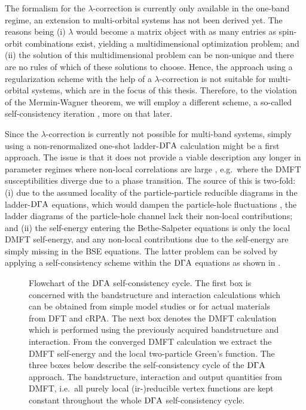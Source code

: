 \documentclass[../../main.tex]{subfiles}
\begin{document}
The formalism for the $\lambda$-correction is currently only available in the one-band regime, an extension to multi-orbital systems has not been derived yet. The reasons being (i) $\lambda$ would become a matrix object with as many entries as spin-orbit combinations exist, yielding a multidimensional optimization problem; and (ii) the solution of this multidimensional problem can be non-unique and there are no rules of which of these solutions to choose. Hence, the approach using a regularization scheme with the help of a $\lambda$-correction is not suitable for multi-orbital systems, which are in the focus of this thesis. Therefore, to  the violation of the Mermin-Wagner theorem, we will employ a different scheme, a so-called self-consistency iteration \cite{Kaufmann2021}, more on that later. 

Since the $\lambda$-correction is currently not possible for multi-band systems, simply using a non-renormalized one-shot ladder-$\text{D}\Gamma\text{A}$ calculation might be a first approach. The issue is that it does not provide a viable description any longer in parameter regimes where non-local correlations are large \cite{Kaufmann2021}, e.g.\ where the DMFT susceptibilities diverge due to a phase transition. The source of this is two-fold: (i) due to the assumed locality of the particle-particle reducible diagrams in the ladder-$\text{D}\Gamma\text{A}$ equations, which would dampen the particle-hole fluctuations \cite{Rohringer2016}, the ladder diagrams of the particle-hole channel lack their non-local contributions; and (ii) the self-energy entering the Bethe-Salpeter equations is only the local DMFT self-energy, and any non-local contributions due to the self-energy are simply missing in the BSE equations. The latter problem can be solved by applying a self-consistency scheme within the $\text{D}\Gamma\text{A}$ equations as shown in  \cite{Kaufmann2021}.
\begin{figure}[ht!]
	\centering
  	
  	\caption{Flowchart of the $\text{D}\Gamma\text{A}$ self-consistency cycle. The first box is concerned with the bandstructure and interaction calculations which can be obtained from simple model studies or for actual materials from DFT and cRPA. The next box denotes the DMFT calculation which is performed using the previously acquired bandstructure and interaction. From the converged DMFT calculation we extract the DMFT self-energy and the local two-particle Green's function. The three boxes below describe the self-consistency cycle of the $\text{D}\Gamma\text{A}$ approach. The bandstructure, interaction and output quantities from DMFT, i.e.\ all purely local (ir-)reducible vertex functions are kept constant throughout the whole $\text{D}\Gamma\text{A}$ self-consistency cycle.}
  	\label{fig:flowchart_self_consistency}
\end{figure}
\end{document}
